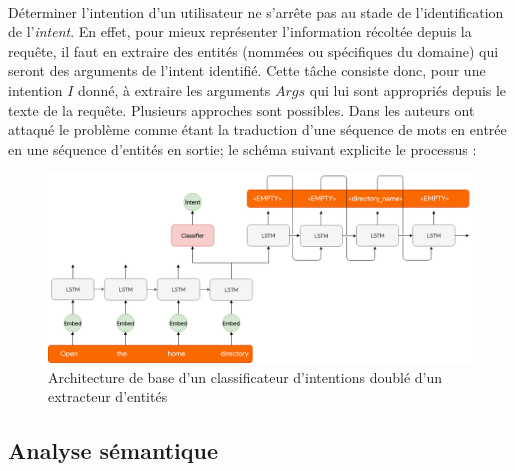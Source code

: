 \paragraph{}
Déterminer l'intention d'un utilisateur ne s'arrête pas au stade de l'identification de l'\textit{intent}. En effet, pour mieux représenter l'information récoltée depuis la requête, il faut en extraire des entités (nommées ou spécifiques du domaine) qui seront des arguments de l'intent identifié. Cette tâche consiste donc, pour une intention $I$ donné, à extraire les arguments $Args$ qui lui sont appropriés depuis le texte de la requête. Plusieurs approches sont possibles. Dans \citep{intent_slots} les auteurs ont attaqué le problème comme étant la traduction d'une séquence de mots en entrée en une séquence d'entités en sortie; le schéma suivant explicite le processus :
\begin{figure}[H]
	\centering
	\includegraphics[width=0.85\linewidth]{images/NLU/seq2seq.png}
	\caption{Architecture de base d'un classificateur d'intentions doublé d'un extracteur d'entités \citep{intent_slots}}
	\label{fig:lstmslots}
\end{figure} 
\subsection{Analyse sémantique}
